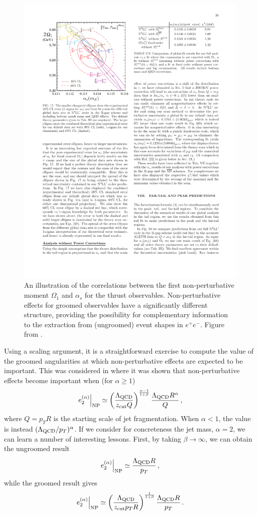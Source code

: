   

\begin{figure}
\begin{center}
\includegraphics[width = 0.6\columnwidth]{figures/correlation_firstmoment.pdf}
\end{center}
\caption{An illustration of the correlations between the first non-perturbative moment $\Omega_1$ and $\alpha_s$ for the thrust observables. Non-perturbative effects for groomed observables have a significantly different structure, providing the possibility for complementary information to the extraction from (ungroomed) event shapes in $e^+e^-$. Figure from \cite{Abbate:2010xh}.}
\label{fig:correlation_firstmoment}
\end{figure}


Using a scaling argument, it is a straightforward exercise to compute the value of the groomed angularities at which non-perturbative effects are expected to be important. This was considered in  \cite{Frye:2016aiz,Dasgupta:2013ihk}
where it was shown that non-perturbative effects become important when (for $\alpha \geq 1$)
\begin{align}
\left. e_{2}^{(\alpha)} \right |_{\text{NP}} \simeq  \left( \frac{{\Lambda_\text{QCD}}}{z_{\rm cut} Q}  \right)^{\frac{\alpha-1}{1+\beta}}  \frac{{\Lambda_\text{QCD}} R^\alpha}{Q}\,,
\end{align}
\noindent where $Q=p_TR$ is the starting scale of jet fragmentation.  When $\alpha< 1$, the value is instead $({\Lambda_\text{QCD}}/p_T)^\alpha$. If we consider for concreteness the jet mass, $\alpha=2$, we can learn a number of interesting lessons. First, by taking $\beta\to \infty$, we can obtain the ungroomed result
\begin{align}
\left. e_{2}^{(\alpha)} \right |_{\text{NP}} \simeq  \frac{{\Lambda_\text{QCD}} R}{p_T}\,,
\end{align} 
while the groomed result gives 
\begin{align}
\left. e_{2}^{(\alpha)} \right |_{\text{NP}} \simeq  \left( \frac{{\Lambda_\text{QCD}}}{z_{\rm cut} p_TR}  \right)^{\frac{1}{1+\beta}}  \frac{{\Lambda_\text{QCD}} R}{p_T}\,.
\end{align}

